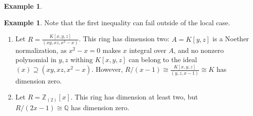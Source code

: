 \documentclass{amsart}[12pt]
\newcommand{\Q}{\mathbb{Q}}
\newcommand{\ZZ}{\mathbb{Z}}
\numberwithin{equation}{section}
\theoremstyle{plain} %
\theoremstyle{definition}
\newtheorem{ex}[equation]{Example}
\theoremstyle{remark}
\begin{document}
\begin{ex}
\begin{ex} Note that the first inequality can fail outside of the local case. 
\begin{enumerate}
\item Let $\displaystyle R=\frac{K[x,y,z]}{(xy,xz,x^2-x)}$. This ring has dimension two: $A=K[y,z]$ is a Noether normalization, as $x^2-x=0$ makes $x$ integral over $A$, and no nonzero polynomial in $y,z$ withing $K[x,y,z]$ can belong to the ideal $(x) \supseteq (xy,xz,x^2-x)$. However, $\displaystyle R/(x-1) \cong \frac{K[x,y,z]}{(y,z,x-1)}\cong K$ has dimension zero.
\item Let $R=\ZZ_{(2)}[x]$. This ring has dimension at least two, but $R/(2x-1)\cong \Q$ has dimension zero.
\end{enumerate}
\end{ex}



\end{ex}
\end{document}
